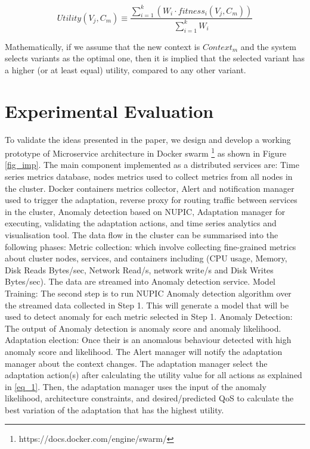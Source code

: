 \documentclass[sigconf]{acmart}
\begin{document}
\begin{equation}
\label{eq_2}
    Utility(V_{j},C_{m}) \equiv \frac{ \sum_{i=1}^{k} (W_{i} \cdot fitness_{i}(V_{j},C_{m}) ) }{\sum_{i=1}^{k} W_{i} }
\end{equation}


Mathematically, if we assume that the new context is $Context_{m}$  and the system selects variants as the optimal one, then it is implied that the selected variant has a higher (or at least equal) utility, compared to any other variant.  
 
 
\section{Experimental Evaluation}

To validate the ideas presented in the paper, we design and develop a working prototype of Microservice architecture in Docker swarm \footnote{https://docs.docker.com/engine/swarm/} as shown in Figure \ref{fig_imp}. The main component implemented as a distributed services are: Time series metrics database, nodes metrics used to collect metrics from all nodes in the cluster. Docker containers metrics collector, Alert and notification manager used to trigger the adaptation, reverse proxy for routing traffic between services in the cluster, Anomaly detection based on NUPIC, Adaptation manager for executing, validating the adaptation actions, and time series analytics and visualisation tool. 
The data flow in the cluster can be summarised into the following phases: 
Metric collection: which involve collecting fine-grained metrics about cluster nodes, services, and containers including (CPU usage, Memory, Disk Reads Bytes/sec, Network Read/s, network write/s and Disk Writes Bytes/sec). The data are streamed into Anomaly detection service. 
Model Training: The second step is to run NUPIC Anomaly detection algorithm over the streamed data collected in Step 1. This will generate a model that will be used to detect anomaly for each metric selected in Step 1. 
Anomaly Detection: The output of Anomaly detection is anomaly score and anomaly likelihood. 
Adaptation election: Once their is an anomalous behaviour detected with high anomaly score and likelihood. The Alert manager will notify the adaptation manager about the context changes. The adaptation manager select the adaptation action(s) after calculating the utility value for all actions as explained in \ref{eq_1}. Then, the adaptation manager uses the input of the anomaly likelihood, architecture constraints, and desired/predicted QoS to calculate the best variation of the adaptation that has the highest utility. 
\end{document}
